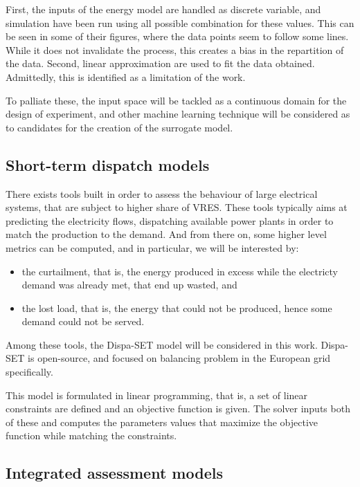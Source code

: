First, the inputs of the energy model are handled as discrete variable, and simulation have been run using all possible combination for these values. This can be seen in some of their figures, where the data points seem to follow some lines. While it does not invalidate the process, this creates a bias in the repartition of the data. Second, linear approximation are used to fit the data obtained. Admittedly, this is identified as a limitation of the work.

To palliate these, the input space will be tackled as a continuous domain for the design of experiment, and other machine learning technique will be considered as to candidates for the creation of the surrogate model.

\subsection{Short-term dispatch models}

There exists tools built in order to assess the behaviour of large electrical systems, that are subject to higher share of VRES. These tools typically aims at predicting the electricity flows, dispatching available power plants in order to match the production to the demand. And from there on, some higher level metrics can be computed, and in particular, we will be interested by:
\begin{itemize}
    \item the curtailment, that is, the energy produced in excess while the electricty demand was already met, that end up wasted, and
    \item the lost load, that is, the energy that could not be produced, hence some demand could not be served.
\end{itemize}

Among these tools, the Dispa-SET model will be considered in this work. Dispa-SET is open-source, and focused on balancing problem in the European grid specifically.

This model is formulated in linear programming, that is, a set of linear constraints are defined and an objective function is given. The solver inputs both of these and computes the parameters values that maximize the objective function while matching the constraints.

\subsection{Integrated assessment models}

